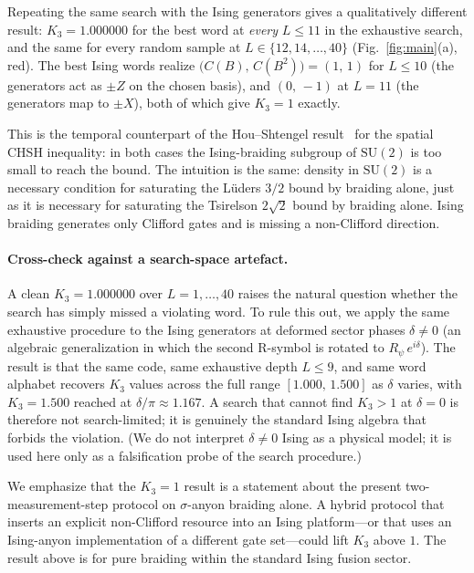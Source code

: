 \documentclass[aps,prx,reprint,amsmath,amssymb,floatfix,nofootinbib,superscriptaddress]{revtex4-2}
\begin{document}
Repeating the same search with the Ising generators gives a
qualitatively different result: $K_{3} = 1.000000$ for the best word
at \emph{every} $L \leq 11$ in the exhaustive search, and the same
for every random sample at $L \in \{12, 14, \ldots, 40\}$
(Fig.~\ref{fig:main}(a), red). The best Ising words realize
$\bigl(C(B),\, C(B^{2})\bigr) = (1,\,1)$ for $L \leq 10$ (the
generators act as $\pm Z$ on the chosen basis), and $(0,\,-1)$ at
$L=11$ (the generators map to $\pm X$), both of which give
$K_{3} = 1$ exactly.

This is the temporal counterpart of the Hou--Shtengel
result~\cite{HouShtengel2016} for the spatial CHSH inequality: in both
cases the Ising-braiding subgroup of $\mathrm{SU}(2)$ is too small to
reach the bound. The intuition is the same: density in
$\mathrm{SU}(2)$ is a necessary condition for saturating the L\"uders
$3/2$ bound by braiding alone, just as it is necessary for saturating
the Tsirelson $2\sqrt{2}$ bound by braiding alone. Ising braiding
generates only Clifford gates and is missing a non-Clifford direction.

\paragraph{Cross-check against a search-space artefact.}
A clean $K_{3}=1.000000$ over $L=1,\ldots,40$ raises the natural
question whether the search has simply missed a violating word. To
rule this out, we apply the same exhaustive procedure to the
Ising generators at deformed sector phases $\delta \neq 0$ (an
algebraic generalization in which the second R-symbol is rotated to
$R_{\psi}\,e^{i\delta}$). The result is that the same code, same
exhaustive depth $L \leq 9$, and same word alphabet recovers
$K_{3}$ values across the full range $[1.000,\,1.500]$ as $\delta$
varies, with $K_{3} = 1.500$ reached at $\delta/\pi \approx 1.167$.
A search that cannot find $K_{3} > 1$ at $\delta = 0$ is therefore
not search-limited; it is genuinely the standard Ising algebra that
forbids the violation. (We do not interpret $\delta \neq 0$ Ising as
a physical model; it is used here only as a falsification probe of
the search procedure.)

We emphasize that the $K_{3} = 1$ result is a statement about the
present two-measurement-step protocol on $\sigma$-anyon braiding
alone. A hybrid protocol that inserts an explicit non-Clifford
resource into an Ising platform---or that uses an Ising-anyon
implementation of a different gate set---could lift $K_{3}$ above $1$.
The result above is for pure braiding within the standard Ising
fusion sector.
\end{document}
